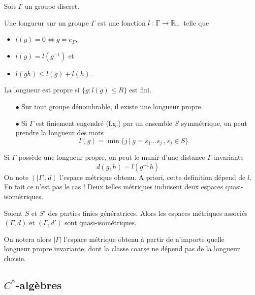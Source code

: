 \documentclass{beamer}
\begin{document}
\begin{frame}
Soit $\Gamma$ un groupe discret.\\
\begin{definition}
Une longueur sur un groupe $\Gamma$ est une fonction $l:\Gamma\rightarrow \mathbb R_+$ telle que 
\begin{itemize}
\item $l(g)=0 \Leftrightarrow g=e_\Gamma$, 
\item $l(g)=l(g^{-1})$ et 
\item $l(gh)\leq l(g)+l(h)$. 
\end{itemize}
La longueur est propre si $\{g : l(g)\leq R\}$ est fini. 
\end{definition}
\begin{itemize}
\item[$\bullet$] Sur tout groupe dénombrable, il existe une longueur propre.
\item[$\bullet$] Si $\Gamma$ est finiement engendré (f.g.) par un ensemble $S$ symmétrique, on peut prendre la longueur des mots
\[l(g) = \min \{j \ |\ g=s_1 ...s_j \ , s_j\in S\}\] 
\end{itemize}
\end{frame}

\begin{frame}
Si $\Gamma$ possède une longueur propre, on peut le munir d'une distance $\Gamma$-invariante 
\[d(g,h)=l(g^{-1}h)\]
On note $(|\Gamma|,d)$ l'espace métrique obtenu. A priori, cette definition dépend de $l$. En fait ce n'est pas le cas ! Deux telles métriques induisent deux espaces quasi-isométriques.
\begin{thm}
Soient $S$ et $S'$ des parties finies génératrices. Alors les espaces métriques associés $(\Gamma,d)$ et $(\Gamma,d')$ sont quasi-isométriques.
\end{thm}

On notera alors $|\Gamma|$ l'espace métrique obtenu à partir de n'importe quelle longueur propre invariante, dont la classe coarse ne dépend pas de la longueur choisie.
\end{frame}

\subsection{$C^*$-algèbres}
\end{document}
